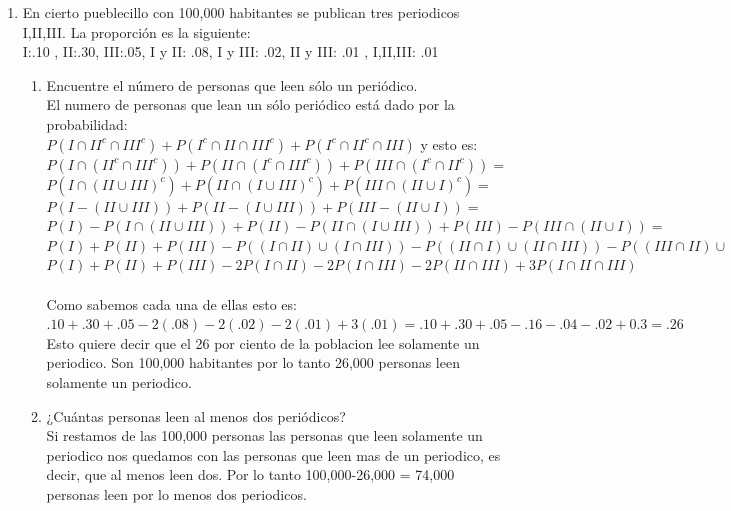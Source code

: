 \documentclass[12pt,a4paper]{report}
\begin{document}
\begin{enumerate}
   \item {
    En cierto pueblecillo con 100,000 habitantes se publican tres periodicos I,II,III. La proporción es la siguiente:\\
I:.10 , II:.30, III:.05, I y II: .08, I y III: .02, II y III: .01 , I,II,III: .01
	\begin{enumerate}[label=\alph*) ]
   \item {
   Encuentre el número de personas que leen sólo un periódico.\\
	El numero de personas que lean un sólo periódico está dado por la probabilidad:\\
	$P(I \cap II^c\cap III^c)+P(I^c \cap II\cap III^c)+P(I^c \cap II^c\cap III)$ y esto es:\\
	$P(I \cap( II^c \cap III^c))+ P(II\cap(I^c \cap III^c))+P(III \cap (I^c \cap II^c))=$ \\
	$P(I \cap (II \cup III)^c)+P(II \cap (I \cup III)^c)+P(III \cap (II \cup I)^c)=$\\
	$P(I-(II\cup III))+P(II-(I \cup III))+P(III-(II \cup I))=$\\
	$P(I)-P(I \cap (II \cup III))+P(II)-P(II \cap (I \cup III))+P(III)-P(III\cap (II\cup I))=$ \\
	$P(I)+P(II)+P(III)-P((I\cap II)\cup(I \cap III))-P((II\cap I)\cup(II \cap III))-P((III\cap II)\cup(III \cap I))=$\\
	$P(I)+P(II)+P(III)-2P(I\cap II)-2P(I\cap III)-2P(II \cap III)+3P(I\cap II \cap III)$ \\\\
	Como sabemos cada una de ellas esto es:\\
	$.10+.30+.05-2(.08)-2(.02)-2(.01)+3(.01)=.10+.30+.05-.16-.04-.02+0.3=.26$\\
	Esto quiere decir que el 26 por ciento de la poblacion lee solamente un periodico. Son 100,000 habitantes por lo tanto 26,000 personas leen solamente un periodico.
   }

   \item {
   ¿Cuántas personas leen al menos dos periódicos?\\
   Si restamos de las 100,000 personas las personas que leen solamente un periodico nos quedamos con las personas que leen mas de un periodico, es decir, que al menos leen dos. Por lo tanto 100,000-26,000 = 74,000 personas leen por lo menos dos periodicos.

   }


\end{enumerate}}
\end{enumerate}
\end{document}
